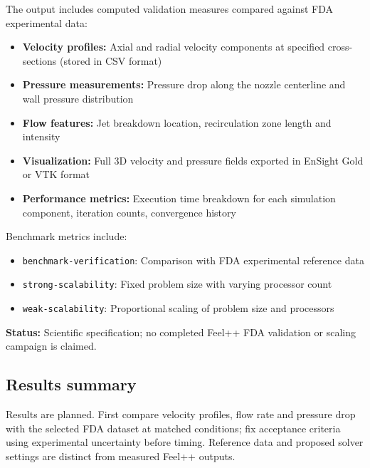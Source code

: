 The output includes computed validation measures compared against FDA experimental data:
\begin{itemize}
    \item \textbf{Velocity profiles:} Axial and radial velocity components at specified cross-sections (stored in CSV format)
    \item \textbf{Pressure measurements:} Pressure drop along the nozzle centerline and wall pressure distribution
    \item \textbf{Flow features:} Jet breakdown location, recirculation zone length and intensity
    \item \textbf{Visualization:} Full 3D velocity and pressure fields exported in EnSight Gold or VTK format
    \item \textbf{Performance metrics:} Execution time breakdown for each simulation component, iteration counts, convergence history
\end{itemize}

Benchmark metrics include:
\begin{itemize}
    \item \texttt{benchmark-verification}: Comparison with FDA experimental reference data
    \item \texttt{strong-scalability}: Fixed problem size with varying processor count
    \item \texttt{weak-scalability}: Proportional scaling of problem size and processors
\end{itemize}


\textbf{Status:} Scientific specification; no completed Feel++ FDA validation or scaling campaign is claimed.




\subsection{Results summary}
Results are planned. First compare velocity profiles, flow rate and pressure drop with the selected FDA dataset at matched conditions; fix acceptance criteria using experimental uncertainty before timing. Reference data and proposed solver settings are distinct from measured Feel++ outputs.


